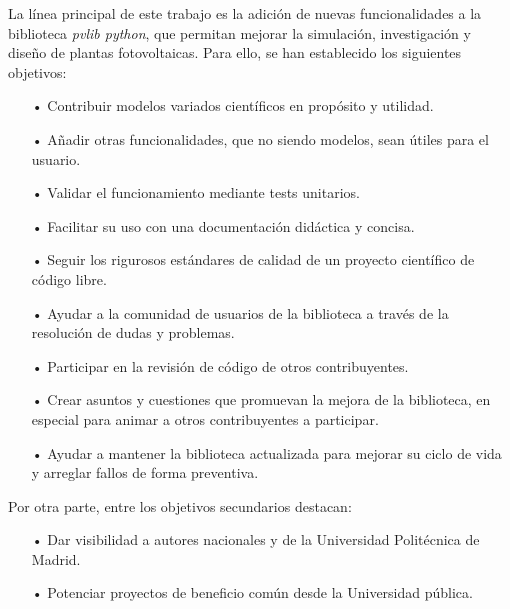 La línea principal de este trabajo es la adición de nuevas funcionalidades a la biblioteca \textit{pvlib python}, que permitan mejorar la simulación, investigación y diseño de plantas fotovoltaicas. Para ello, se han establecido los siguientes objetivos:

\begin{itemize}

    \item[•] Contribuir modelos variados científicos en propósito y utilidad.

    \item[•] Añadir otras funcionalidades, que no siendo modelos, sean útiles para el usuario.

    \item[•] Validar el funcionamiento mediante tests unitarios.

    \item[•] Facilitar su uso con una documentación didáctica y concisa.

    \item[•] Seguir los rigurosos estándares de calidad de un proyecto científico de código libre.

    \item[•] Ayudar a la comunidad de usuarios de la biblioteca a través de la resolución de dudas y problemas.

    \item[•] Participar en la revisión de código de otros contribuyentes.

    \item[•] Crear asuntos y cuestiones que promuevan la mejora de la biblioteca, en especial para animar a otros contribuyentes a participar.

    \item[•] Ayudar a mantener la biblioteca actualizada para mejorar su ciclo de vida y arreglar fallos de forma preventiva.

\end{itemize}

Por otra parte, entre los objetivos secundarios destacan:

\begin{itemize}

    \item [•] Dar visibilidad a autores nacionales y de la Universidad Politécnica de Madrid.
    
    \item [•] Potenciar proyectos de beneficio común desde la Universidad pública.

\end{itemize}

